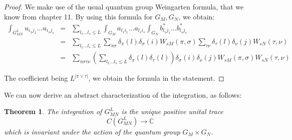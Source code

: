 \documentclass[12pt]{amsbook}
\newtheorem{theorem}{Theorem}[chapter]
\begin{document}
\begin{proof}
We make use of the usual quantum group Weingarten formula, that we know from chapter 11. By using this formula for $G_M,G_N$, we obtain:
\begin{eqnarray*}
\int_{G_{MN}^L}u_{i_1j_1}\ldots u_{i_sj_s}
&=&\sum_{l_1\ldots l_s\leq L}\int_{G_M}a_{l_1i_1}\ldots a_{l_si_s}\int_{G_N}b_{l_1j_1}^*\ldots b_{l_sj_s}^*\\
&=&\sum_{l_1\ldots l_s\leq L}\sum_{\pi\sigma}\delta_\pi(l)\delta_\sigma(i)W_{sM}(\pi,\sigma)\sum_{\tau\nu}\delta_\tau(l)\delta_\nu(j)W_{sN}(\tau,\nu)\\
&=&\sum_{\pi\sigma\tau\nu}\left(\sum_{l_1\ldots l_s\leq L}\delta_\pi(l)\delta_\tau(l)\right)\delta_\sigma(i)\delta_\nu(j)W_{sM}(\pi,\sigma)W_{sN}(\tau,\nu)
\end{eqnarray*}

The coefficient being $L^{|\pi\vee\tau|}$, we obtain the formula in the statement.
\end{proof}

We can now derive an abstract characterization of the integration, as follows:

\begin{theorem}
The integration of $G_{MN}^L$ is the unique positive unital trace 
$$C(G_{MN}^L)\to\mathbb C$$
which is invariant under the action of the quantum group $G_M\times G_N$.
\end{theorem}
\end{document}
